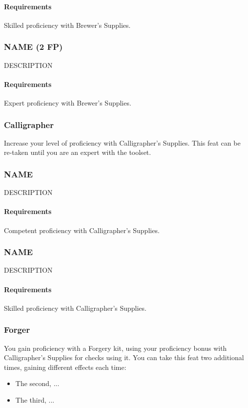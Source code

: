     \paragraph{Requirements} Skilled proficiency with Brewer's Supplies.
\subsubsection{NAME (2 FP)} \label{feat::name}
    DESCRIPTION
    \paragraph{Requirements} Expert proficiency with Brewer's Supplies.
\subsubsection{Calligrapher} \label{feat::calligrapher}
    Increase your level of proficiency with Calligrapher's Supplies.
    This feat can be re-taken until you are an expert with the toolset.
\subsubsection{NAME} \label{feat::name}
    DESCRIPTION
    \paragraph{Requirements} Competent proficiency with Calligrapher's Supplies.
\subsubsection{NAME} \label{feat::name}
    DESCRIPTION
    \paragraph{Requirements} Skilled proficiency with Calligrapher's Supplies.
\subsubsection{Forger} \label{feat::forger}
    You gain proficiency with a Forgery kit, using your proficiency bonus with Calligrapher's Supplies for checks using it.
    You can take this feat two additional times, gaining different effects each time:
    \begin{itemize}
        \item The second, ...
        \item The third, ...
    \end{itemize}

